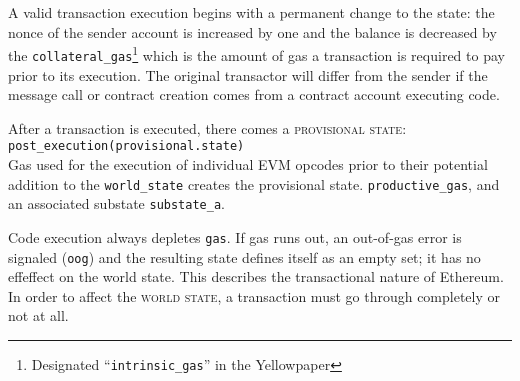 \documentclass[10pt,a4paper,oneside]{scrartcl}
\begin{document}
A valid transaction execution begins with a permanent change to the state: the nonce of the sender account is increased by one and the balance is decreased by the \texttt{collateral\_gas}\footnote{Designated ``\texttt{intrinsic\_gas}'' in the Yellowpaper} which is the amount of gas a transaction is required to pay prior to its execution. The original transactor will differ from the sender if the message call or contract creation comes from a contract account executing code. 

After a transaction is executed, there comes a \textsc{provisional state}:
\\

\texttt{post\_execution(provisional.state)}
\\

Gas used for the execution of individual EVM opcodes prior to their potential addition to the \texttt{world\_state} creates the provisional state. \texttt{productive\_gas}, and an associated substate \texttt{substate\_a}. 


Code execution always depletes \texttt{gas}. If gas runs out, an out-of-gas error is signaled (\texttt{oog}) and the resulting state defines itself as an empty set; it has no effeffect on the world state. This describes the transactional nature of Ethereum. In order to affect the \textsc{world state}, a transaction must go through completely or not at all. 
\end{document}
